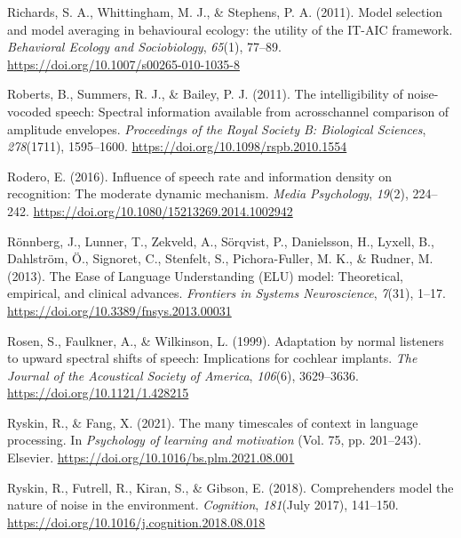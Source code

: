 \documentclass[a4paper, nobind]{templates/ociamthesis}
\newlength{\cslhangindent}
\newenvironment{CSLReferences}[2] %
 {%
  \setlength{\parindent}{0pt}
  \ifodd #1
  \let\oldpar\par
  \def\par{\hangindent=\cslhangindent\oldpar}
  \fi
  \setlength{\parskip}{1mm}
  \setlength{\baselineskip}{6mm}
 }%
 {}
\begin{document}
\begin{CSLReferences}{1}{0}
\leavevmode{}%
Richards, S. A., Whittingham, M. J., \& Stephens, P. A. (2011). Model selection and model averaging in behavioural ecology: the utility of the IT-AIC framework. \emph{Behavioral Ecology and Sociobiology}, \emph{65}(1), 77--89. \url{https://doi.org/10.1007/s00265-010-1035-8}

\leavevmode{}%
Roberts, B., Summers, R. J., \& Bailey, P. J. (2011). The intelligibility of noise-vocoded speech: Spectral information available from acrosschannel comparison of amplitude envelopes. \emph{Proceedings of the Royal Society B: Biological Sciences}, \emph{278}(1711), 1595--1600. \url{https://doi.org/10.1098/rspb.2010.1554}

\leavevmode{}%
Rodero, E. (2016). {Influence of speech rate and information density on recognition: The moderate dynamic mechanism}. \emph{Media Psychology}, \emph{19}(2), 224--242. \url{https://doi.org/10.1080/15213269.2014.1002942}

\leavevmode{}%
Rönnberg, J., Lunner, T., Zekveld, A., Sörqvist, P., Danielsson, H., Lyxell, B., Dahlström, Ö., Signoret, C., Stenfelt, S., Pichora-Fuller, M. K., \& Rudner, M. (2013). {The Ease of Language Understanding (ELU) model: Theoretical, empirical, and clinical advances}. \emph{Frontiers in Systems Neuroscience}, \emph{7}(31), 1--17. \url{https://doi.org/10.3389/fnsys.2013.00031}

\leavevmode{}%
Rosen, S., Faulkner, A., \& Wilkinson, L. (1999). Adaptation by normal listeners to upward spectral shifts of speech: Implications for cochlear implants. \emph{The Journal of the Acoustical Society of America}, \emph{106}(6), 3629--3636. \url{https://doi.org/10.1121/1.428215}

\leavevmode{}%
Ryskin, R., \& Fang, X. (2021). The many timescales of context in language processing. In \emph{Psychology of learning and motivation} (Vol. 75, pp. 201--243). Elsevier. \url{https://doi.org/10.1016/bs.plm.2021.08.001}

\leavevmode{}%
Ryskin, R., Futrell, R., Kiran, S., \& Gibson, E. (2018). {Comprehenders model the nature of noise in the environment}. \emph{Cognition}, \emph{181}(July 2017), 141--150. \url{https://doi.org/10.1016/j.cognition.2018.08.018}


\end{CSLReferences}
\end{document}
